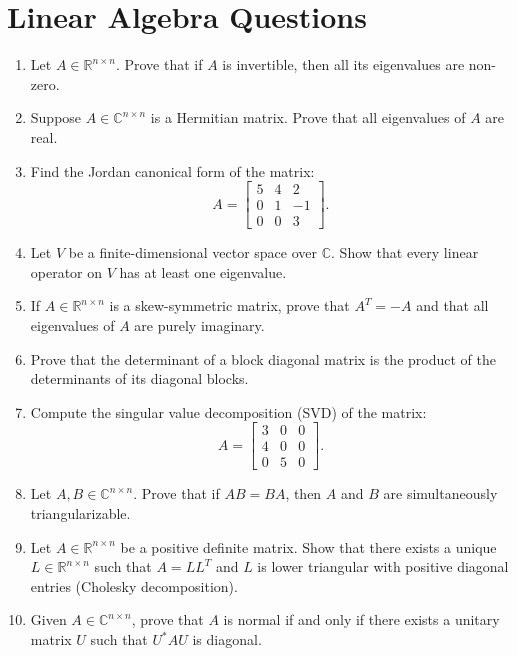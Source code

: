 \documentclass{article}
\begin{document}
\section*{Linear Algebra Questions}

\begin{enumerate}
    \item Let \( A \in \mathbb{R}^{n \times n} \). Prove that if \( A \) is invertible, then all its eigenvalues are non-zero.

    \item Suppose \( A \in \mathbb{C}^{n \times n} \) is a Hermitian matrix. Prove that all eigenvalues of \( A \) are real.

    \item Find the Jordan canonical form of the matrix:
    \[
    A = 
    \begin{bmatrix}
    5 & 4 & 2 \\
    0 & 1 & -1 \\
    0 & 0 & 3
    \end{bmatrix}.
    \]

    \item Let \( V \) be a finite-dimensional vector space over \( \mathbb{C} \). Show that every linear operator on \( V \) has at least one eigenvalue.

    \item If \( A \in \mathbb{R}^{n \times n} \) is a skew-symmetric matrix, prove that \( A^T = -A \) and that all eigenvalues of \( A \) are purely imaginary.

    \item Prove that the determinant of a block diagonal matrix is the product of the determinants of its diagonal blocks.

    \item Compute the singular value decomposition (SVD) of the matrix:
    \[
    A = 
    \begin{bmatrix}
    3 & 0 & 0 \\
    4 & 0 & 0 \\
    0 & 5 & 0
    \end{bmatrix}.
    \]

    \item Let \( A, B \in \mathbb{C}^{n \times n} \). Prove that if \( AB = BA \), then \( A \) and \( B \) are simultaneously triangularizable.

    \item Let \( A \in \mathbb{R}^{n \times n} \) be a positive definite matrix. Show that there exists a unique \( L \in \mathbb{R}^{n \times n} \) such that \( A = LL^T \) and \( L \) is lower triangular with positive diagonal entries (Cholesky decomposition).

    \item Given \( A \in \mathbb{C}^{n \times n} \), prove that \( A \) is normal if and only if there exists a unitary matrix \( U \) such that \( U^*AU \) is diagonal.
\end{enumerate}
\end{document}
